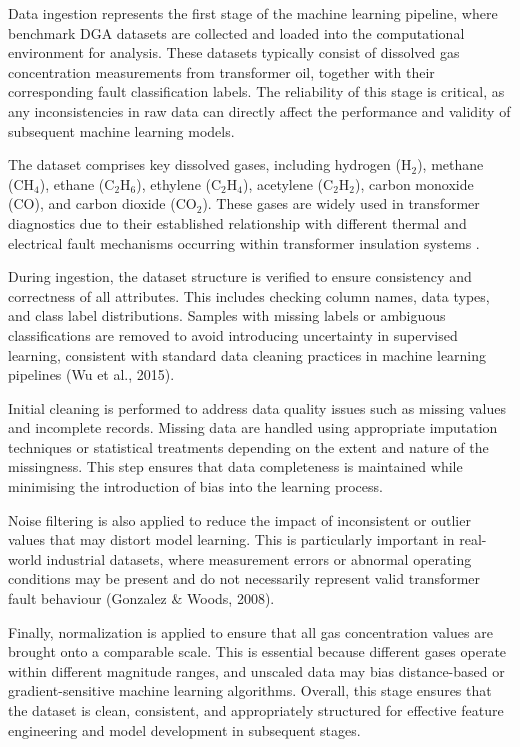 Data ingestion represents the first stage of the machine learning pipeline, where benchmark DGA datasets are collected and loaded into the computational environment for analysis. These datasets typically consist of dissolved gas concentration measurements from transformer oil, together with their corresponding fault classification labels. The reliability of this stage is critical, as any inconsistencies in raw data can directly affect the performance and validity of subsequent machine learning models.

The dataset comprises key dissolved gases, including hydrogen (H$_2$), methane (CH$_4$), ethane (C$_2$H$_6$), ethylene (C$_2$H$_4$), acetylene (C$_2$H$_2$), carbon monoxide (CO), and carbon dioxide (CO$_2$). These gases are widely used in transformer diagnostics due to their established relationship with different thermal and electrical fault mechanisms occurring within transformer insulation systems \parencite{Ali2023ConventionalDGA}.

During ingestion, the dataset structure is verified to ensure consistency and correctness of all attributes. This includes checking column names, data types, and class label distributions. Samples with missing labels or ambiguous classifications are removed to avoid introducing uncertainty in supervised learning, consistent with standard data cleaning practices in machine learning pipelines (Wu et al., 2015).

Initial cleaning is performed to address data quality issues such as missing values and incomplete records. Missing data are handled using appropriate imputation techniques or statistical treatments depending on the extent and nature of the missingness. This step ensures that data completeness is maintained while minimising the introduction of bias into the learning process.

Noise filtering is also applied to reduce the impact of inconsistent or outlier values that may distort model learning. This is particularly important in real-world industrial datasets, where measurement errors or abnormal operating conditions may be present and do not necessarily represent valid transformer fault behaviour (Gonzalez & Woods, 2008).

Finally, normalization is applied to ensure that all gas concentration values are brought onto a comparable scale. This is essential because different gases operate within different magnitude ranges, and unscaled data may bias distance-based or gradient-sensitive machine learning algorithms. Overall, this stage ensures that the dataset is clean, consistent, and appropriately structured for effective feature engineering and model development in subsequent stages.

